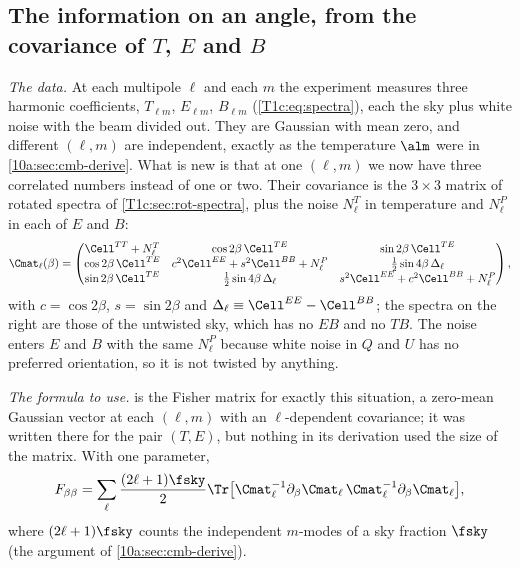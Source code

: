 \subsection{The information on an angle, from the covariance of \texorpdfstring{$T$, $E$ and $B$}{T, E and B}}
\label{10c:sec:fisher-beta}

\emph{The data.} At each multipole $\ell$ and each $m$ the experiment measures three harmonic coefficients,
$T_{\ell m}$, $E_{\ell m}$, $B_{\ell m}$ (\cref{T1c:eq:spectra}), each the sky plus white noise with the beam divided
out. They are Gaussian with mean zero, and different $(\ell,m)$ are independent, exactly as the temperature
$\alm$ were in \cref{10a:sec:cmb-derive}. What is new is that at one $(\ell,m)$ we now have three correlated numbers
instead of one or two. Their covariance is the $3\times3$ matrix of rotated spectra of \cref{T1c:sec:rot-spectra},
plus the noise $N^T_\ell$ in temperature and $N^P_\ell$ in each of $E$ and $B$:
\begin{equation}
  \Cmat_\ell(\beta)=
  \begin{pmatrix}
    \Cell^{TT}+N^T_\ell & \cos2\beta\,\Cell^{TE} & \sin2\beta\,\Cell^{TE}\\
    \cos2\beta\,\Cell^{TE} & c^2\Cell^{EE}+s^2\Cell^{BB}+N^P_\ell & \tfrac12\sin4\beta\,\Delta_\ell\\
    \sin2\beta\,\Cell^{TE} & \tfrac12\sin4\beta\,\Delta_\ell & s^2\Cell^{EE}+c^2\Cell^{BB}+N^P_\ell
  \end{pmatrix},
  \label{10c:eq:teb-cov}
\end{equation}
with $c=\cos2\beta$, $s=\sin2\beta$ and $\Delta_\ell\equiv\Cell^{EE}-\Cell^{BB}$; the spectra on the right are those of
the untwisted sky, which has no $EB$ and no $TB$. The noise enters $E$ and $B$ with the same $N^P_\ell$ because white
noise in $Q$ and $U$ has no preferred orientation, so it is not twisted by anything.

\emph{The formula to use.}  is the Fisher matrix for exactly this situation, a
zero-mean Gaussian vector at each $(\ell,m)$ with an $\ell$-dependent covariance; it was written there for the pair
$(T,E)$, but nothing in its derivation used the size of the matrix. With one parameter,
\begin{equation}
  F_{\beta\beta}=\sum_\ell\frac{(2\ell+1)\fsky}{2}\Tr\bigl[\Cmat_\ell^{-1}\partial_\beta\Cmat_\ell\,\Cmat_\ell^{-1}\partial_\beta\Cmat_\ell\bigr],
  \label{10c:eq:fisher-trace}
\end{equation}
where $(2\ell+1)\fsky$ counts the independent $m$-modes of a sky fraction $\fsky$ (the argument of
\cref{10a:sec:cmb-derive}).

